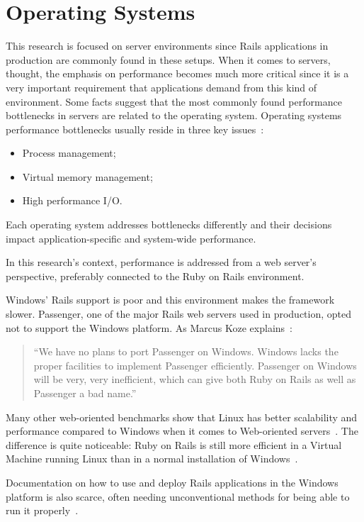 \section{Operating Systems} %
\label{state:sec:operating_systems}

This research is focused on server environments since Rails applications in production are commonly found in these setups. When it comes to servers, thought, the emphasis on performance becomes much more critical since it is a very important requirement that applications demand from this kind of environment. Some facts suggest that the most commonly found performance bottlenecks in servers are related to the operating system. Operating systems performance bottlenecks usually reside in three key issues~\cite{os_performance_server}:
\begin{itemize}
\item Process management;
\item Virtual memory management;
\item High performance I/O.
\end{itemize}
Each operating system addresses bottlenecks differently and their decisions impact application-specific and system-wide performance.

In this research's context, performance is addressed from a web server's perspective, preferably connected to the Ruby on Rails environment.

Windows' Rails support is poor and this environment makes the framework slower. Passenger, one of the major Rails web servers used in production, opted not to support the Windows platform. As Marcus Koze explains~\cite{marcus_koze_passenger}:
\begin{quote}
  ``We have no plans to port Passenger on Windows. Windows lacks the proper facilities to implement Passenger efficiently. Passenger on Windows will be very, very inefficient, which can give both Ruby on Rails as well as Passenger a bad name.''
\end{quote}
Many other web-oriented benchmarks show that Linux has better scalability and performance compared to Windows when it comes to Web-oriented servers~\cite{apache_tomcat_performance_linux_windows, php_apache_linux_windows}. The difference is quite noticeable: Ruby on Rails is still more efficient in a Virtual Machine running Linux than in a normal installation of Windows~\cite{linux_virtualbox_windows_rails}.

Documentation on how to use and deploy Rails applications in the Windows platform is also scarce, often needing unconventional methods for being able to run it properly~\cite{rails_windows}.

